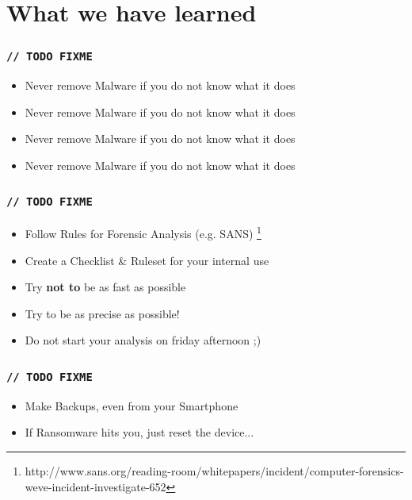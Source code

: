 \documentclass[12pt,a4paper]{beamer}
\begin{document}
\section{What we have learned}

\begin{frame}
\frametitle{\texttt{// TODO FIXME}}
\begin{itemize}
	\item Never remove Malware if you do not know what it does
	\item Never remove Malware if you do not know what it does
	\item Never remove Malware if you do not know what it does
	\item Never remove Malware if you do not know what it does

\end{itemize}

\end{frame}

\begin{frame}
\frametitle{\texttt{// TODO FIXME}}
\begin{itemize}
	\item Follow Rules for Forensic Analysis (e.g. SANS) \footnote{http://www.sans.org/reading-room/whitepapers/incident/computer-forensics-weve-incident-investigate-652}
	\item Create a Checklist \& Ruleset for your internal use
	\item Try \textbf{not to} be as fast as possible
	\item Try to be as precise as possible!
	\item Do not start your analysis on friday afternoon ;)
\end{itemize}
\end{frame}

\begin{frame}
\frametitle{\texttt{// TODO FIXME}}

\begin{itemize}
	\item Make Backups, even from your Smartphone
	\item If Ransomware hits you, just reset the device...
\end{itemize}

\end{frame}
\end{document}
